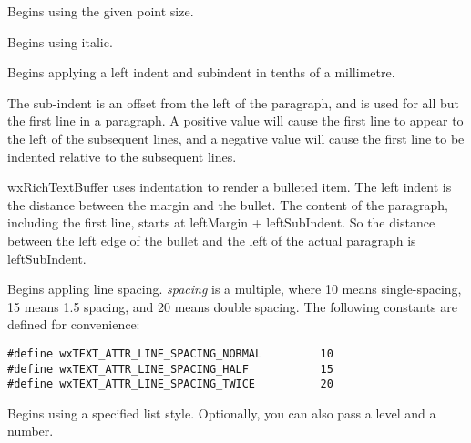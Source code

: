 
Begins using the given point size.

\label{wxrichtextctrlbeginitalic}


Begins using italic.

\label{wxrichtextctrlbeginleftindent}


Begins applying a left indent and subindent in tenths of a millimetre.

The sub-indent is an offset from the left of the paragraph, and is used for all but the
first line in a paragraph. A positive value will cause the first line to appear to the left
of the subsequent lines, and a negative value will cause the first line to be indented
relative to the subsequent lines.

wxRichTextBuffer uses indentation to render a bulleted item. The left indent is the distance between
the margin and the bullet. The content of the paragraph, including the first line, starts
at leftMargin + leftSubIndent. So the distance between the left edge of the bullet and the
left of the actual paragraph is leftSubIndent.

\label{wxrichtextctrlbeginlinespacing}


Begins appling line spacing. {\it spacing} is a multiple, where 10 means single-spacing,
15 means 1.5 spacing, and 20 means double spacing. The following constants are
defined for convenience:

{\small
\begin{verbatim}
#define wxTEXT_ATTR_LINE_SPACING_NORMAL         10
#define wxTEXT_ATTR_LINE_SPACING_HALF           15
#define wxTEXT_ATTR_LINE_SPACING_TWICE          20
\end{verbatim}
}

\label{wxrichtextctrlbeginliststyle}


Begins using a specified list style. Optionally, you can also pass a level and a number.

